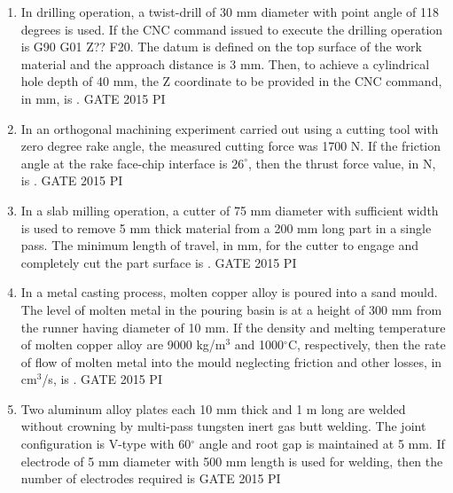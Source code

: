 \documentclass[journal,12pt,onecolumn]{IEEEtran}
\theoremstyle{remark}
\begin{document}
\begin{enumerate}
\item In drilling operation, a twist-drill of 30 mm diameter with point angle of 118 degrees is used. If the CNC command issued to execute the drilling operation is G90 G01 Z?? F20. The datum is defined on the top surface of the work material and the approach distance is 3 mm. Then, to achieve a cylindrical hole depth of 40 mm, the Z coordinate to be provided in the CNC command, in mm, is \underline{\hspace{2cm}}. \hfill{GATE 2015 PI}
\item In an orthogonal machining experiment carried out using a cutting tool with zero degree rake angle, the measured cutting force was 1700 N. If the friction angle at the rake face-chip interface is $26^\circ$, then the thrust force value, in N, is \underline{\hspace{2cm}}. \hfill{GATE 2015 PI}

\item In a slab milling operation, a cutter of 75 mm diameter with sufficient width is used to remove 5 mm thick material from a 200 mm long part in a single pass. The minimum length of travel, in mm, for the cutter to engage and completely cut the part surface is \underline{\hspace{2cm}}. \hfill{GATE 2015 PI}

\item In a metal casting process, molten copper alloy is poured into a sand mould. The level of molten metal in the pouring basin is at a height of 300 mm from the runner having diameter of 10 mm. If the density and melting temperature of molten copper alloy are 9000 kg/m$^3$ and 1000$^\circ$C, respectively, then the rate of flow of molten metal into the mould neglecting friction and other losses, in cm$^3$/s, is \underline{\hspace{2cm}}. \hfill{GATE 2015 PI}

\item Two aluminum alloy plates each 10 mm thick and 1 m long are welded without crowning by multi-pass tungsten inert gas butt welding. The joint configuration is V-type with 60$^\circ$ angle and root gap is maintained at 5 mm. If electrode of 5 mm diameter with 500 mm length is used for welding, then the number of electrodes required is \hfill{GATE 2015 PI}
\begin{enumerate}
\end{enumerate}


\end{enumerate}
\end{document}
